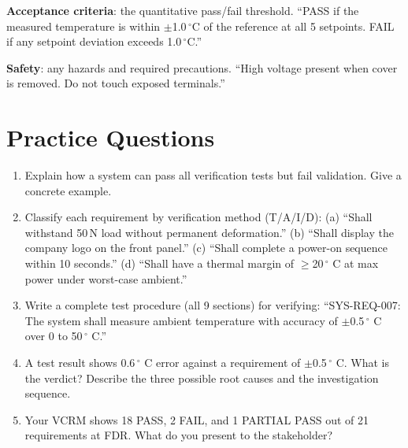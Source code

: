 \documentclass[11pt,letterpaper,twoside,openany]{book}
\newcommand{\degC}{\ensuremath{{}^{\circ}\text{C}}}
\begin{document}
\textbf{Acceptance criteria}: the quantitative pass/fail threshold. ``PASS if the measured temperature is within $\pm$1.0\,\degC{} of the reference at all 5 setpoints. FAIL if any setpoint deviation exceeds 1.0\,\degC{}.''

\textbf{Safety}: any hazards and required precautions. ``High voltage present when cover is removed. Do not touch exposed terminals.''

\section{Practice Questions}
\begin{enumerate}[leftmargin=1.5em]
\item Explain how a system can pass all verification tests but fail validation. Give a concrete example.
\item Classify each requirement by verification method (T/A/I/D): (a) ``Shall withstand 50\,N load without permanent deformation.'' (b) ``Shall display the company logo on the front panel.'' (c) ``Shall complete a power-on sequence within 10 seconds.'' (d) ``Shall have a thermal margin of $\geq$20\,$^{\circ}$ C at max power under worst-case ambient.''
\item Write a complete test procedure (all 9 sections) for verifying: ``SYS-REQ-007: The system shall measure ambient temperature with accuracy of $\pm$0.5\,$^{\circ}$ C over 0 to 50\,$^{\circ}$ C.''
\item A test result shows 0.6\,$^{\circ}$ C error against a requirement of $\pm$0.5\,$^{\circ}$ C. What is the verdict? Describe the three possible root causes and the investigation sequence.
\item Your VCRM shows 18 PASS, 2 FAIL, and 1 PARTIAL PASS out of 21 requirements at FDR. What do you present to the stakeholder?
\end{enumerate}
\end{document}
